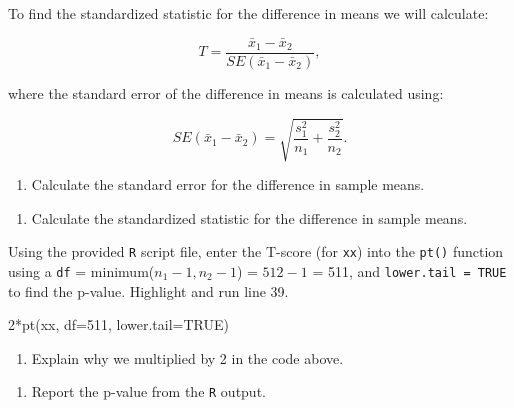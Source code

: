 \documentclass[
]{report}
\newenvironment{Shaded}{\begin{snugshade}}{\end{snugshade}}
\newcommand{\AttributeTok}[1]{\textcolor[rgb]{0.77,0.63,0.00}{#1}}
\newcommand{\ConstantTok}[1]{\textcolor[rgb]{0.00,0.00,0.00}{#1}}
\newcommand{\DecValTok}[1]{\textcolor[rgb]{0.00,0.00,0.81}{#1}}
\newcommand{\FunctionTok}[1]{\textcolor[rgb]{0.00,0.00,0.00}{#1}}
\newcommand{\NormalTok}[1]{#1}
\newcommand{\SpecialCharTok}[1]{\textcolor[rgb]{0.00,0.00,0.00}{#1}}
\providecommand{\tightlist}{%
  \setlength{\itemsep}{0pt}\setlength{\parskip}{0pt}}
\begin{document}
\vspace{1in}

To find the standardized statistic for the difference in means we will calculate:

\[T = \frac{\bar{x}_1-\bar{x}_2}{SE(\bar{x}_1-\bar{x}_2)},\]

where the standard error of the difference in means is calculated using:

\[SE(\bar{x}_1 -\bar{x}_2)=\sqrt{\frac{s_1^2}{n_1}+\frac{s_2^2}{n_2}}.\]

\begin{enumerate}
\def\labelenumi{\arabic{enumi}.}
\setcounter{enumi}{4}
\tightlist
\item
  Calculate the standard error for the difference in sample means.
\end{enumerate}

\vspace{0.5in}

\begin{enumerate}
\def\labelenumi{\arabic{enumi}.}
\setcounter{enumi}{5}
\tightlist
\item
  Calculate the standardized statistic for the difference in sample means.
\end{enumerate}

\vspace{0.5in}

Using the provided \texttt{R} script file, enter the T-score (for \texttt{xx}) into the \texttt{pt()} function using a \texttt{df} = minimum(\(n_1 - 1, n_2 - 1\)) = \(512 - 1\) = 511, and \texttt{lower.tail\ =\ TRUE} to find the p-value. Highlight and run line 39.

\begin{Shaded}
\begin{Highlighting}[]
\DecValTok{2}\SpecialCharTok{*}\FunctionTok{pt}\NormalTok{(xx, }\AttributeTok{df=}\DecValTok{511}\NormalTok{, }\AttributeTok{lower.tail=}\ConstantTok{TRUE}\NormalTok{)}
\end{Highlighting}
\end{Shaded}

\begin{enumerate}
\def\labelenumi{\arabic{enumi}.}
\setcounter{enumi}{6}
\tightlist
\item
  Explain why we multiplied by 2 in the code above.
\end{enumerate}

\vspace{0.3in}

\begin{enumerate}
\def\labelenumi{\arabic{enumi}.}
\setcounter{enumi}{7}
\tightlist
\item
  Report the p-value from the \texttt{R} output.
\end{enumerate}
\end{document}

